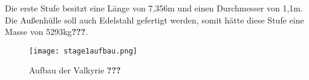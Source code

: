 Die erste Stufe besitzt eine Länge von 7,356m und einen Durchmesser von 1,1m. Die Außenhülle soll auch Edelstahl gefertigt werden, somit hätte diese Stufe eine Masse von 5293kg\textbf{???}.
\begin{figure}[h]
	\centering
	\texttt{[image: stage1aufbau.png]}
	\begin{flushright}
	\end{flushright}
	\caption{Aufbau der Valkyrie \textbf{???}}
	\label{abb_1stage}
\end{figure}
